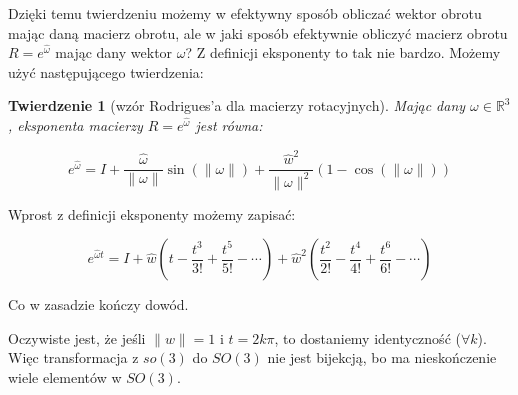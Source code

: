 \documentclass[a4paper,12pt]{article}
\newtheorem{theo}[defi]{Twierdzenie}
\newcommand{\RR}{\mathbb{R}^3}
\begin{document}
Dzięki temu twierdzeniu możemy w efektywny sposób obliczać wektor obrotu mając daną macierz obrotu, ale w jaki sposób efektywnie obliczyć macierz obrotu $R = e^{\hat{\omega}}$ mając dany wektor $\omega$? Z definicji eksponenty to tak nie bardzo. Możemy użyć następującego twierdzenia:

\begin{theo}[wzór Rodrigues'a dla macierzy rotacyjnych]
Mając dany $\omega \in \RR$, eksponenta macierzy $R = e^{\hat{\omega}}$ jest równa:
\end{theo}

\begin{equation}
e^{\hat{\omega}}=I + \frac{\hat{\omega}}{\| \omega \|}\sin(\| \omega \|) + \frac{\hat{w}^2}{\| \omega \|^2}(1 - \cos(\| \omega \|))
\end{equation}

\noindent Wprost z definicji eksponenty możemy zapisać:

\begin{equation}
e^{\hat{\omega}t}= I + \hat{w}(t - \frac{t^3}{3!} + \frac{t^5}{5!} - \cdots) + \hat{w}^2(\frac{t^2}{2!} - \frac{t^4}{4!} + \frac{t^6}{6!} - \cdots)
\end{equation}

\noindent Co w zasadzie kończy dowód.

Oczywiste jest, że jeśli $\| w \|=1$ i $t=2k\pi$, to dostaniemy identyczność ($\forall k$). Więc transformacja z $so(3)$ do $SO(3)$ nie jest bijekcją, bo ma nieskończenie wiele elementów w $SO(3)$.
\end{document}
